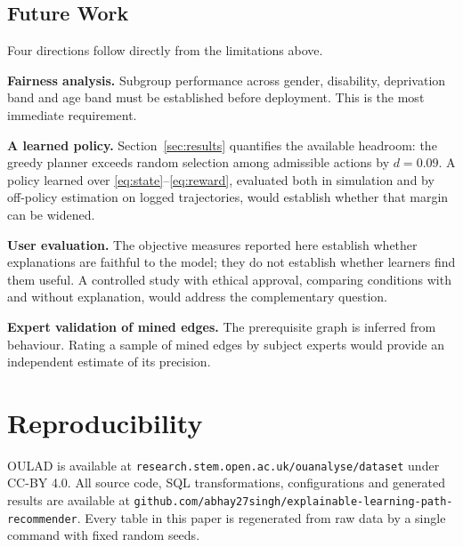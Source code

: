 \documentclass[conference]{IEEEtran}
\begin{document}
\subsection{Future Work}

Four directions follow directly from the limitations above.

\textbf{Fairness analysis.} Subgroup performance across gender, disability, deprivation
band and age band must be established before deployment. This is the most immediate
requirement.

\textbf{A learned policy.} Section~\ref{sec:results} quantifies the available headroom:
the greedy planner exceeds random selection among admissible actions by $d = 0.09$. A
policy learned over \eqref{eq:state}--\eqref{eq:reward}, evaluated both in simulation and
by off-policy estimation on logged trajectories, would establish whether that margin can
be widened.

\textbf{User evaluation.} The objective measures reported here establish whether
explanations are faithful to the model; they do not establish whether learners find them
useful. A controlled study with ethical approval, comparing conditions with and without
explanation, would address the complementary question.

\textbf{Expert validation of mined edges.} The prerequisite graph is inferred from
behaviour. Rating a sample of mined edges by subject experts would provide an independent
estimate of its precision.

\section*{Reproducibility}

OULAD is available at \texttt{research.stem.open.ac.uk/ouanalyse/dataset} under CC-BY 4.0.
All source code, SQL transformations, configurations and generated results are available
at \texttt{github.com/abhay27singh/explainable-\allowbreak learning-path-recommender}.
Every table in this paper is regenerated from raw data by a single command with fixed
random seeds.

\end{document}
